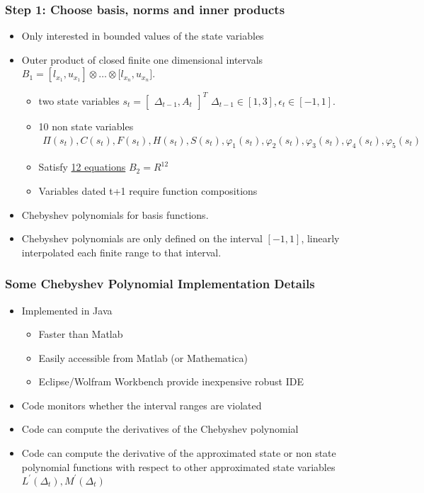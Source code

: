 \documentclass[handout]{beamer}
\begin{document}
\begin{frame}

\frametitle{Step 1: Choose basis, norms and inner products }

\begin{itemize}
\item Only interested in bounded values of the state variables
\item Outer product of closed finite one dimensional intervals
  $B_{1}=[l_{x_{1}},u_{x_{1}}]\otimes \ldots \otimes \lbrack
  l_{x_{n}},u_{x_{n}}]$.
  \begin{itemize}
  \item two state variables $s_t =
    \begin{bmatrix}
      \Delta_{t-1}, A_{t}
    \end{bmatrix}^T$ $\Delta _{t-1} \in [1,3], \epsilon_t \in [-1,1]$.
  \item 10 non state variables
    \begin{gather*}
      \Pi(s_{t}), C(s_{t}), F(s_{t}), H(s_{t}), S(s_{t}),
      \varphi_1(s_{t}),\varphi_{2}(s_{t}),\varphi_{3}(s_{t}),
      \varphi_{4}(s_{t}),\varphi_5(s_{t})
    \end{gather*}
  \item Satisfy \hyperref[eqns]{12 equations} $B_2=R^{12}$
  \item Variables dated t+1 require function compositions
  \end{itemize}
\item Chebyshev polynomials for basis functions.
\item Chebyshev polynomials are only defined on the interval $[-1,1]$,
  linearly interpolated each finite range to that interval.
\end{itemize}

\end{frame}
\begin{frame}

\frametitle{Some Chebyshev Polynomial Implementation Details}
\begin{itemize}
\item Implemented in Java
  \begin{itemize}
  \item Faster than Matlab
  \item Easily accessible from Matlab (or Mathematica)
  \item Eclipse/Wolfram Workbench provide inexpensive robust IDE
  \end{itemize}
\item Code monitors whether the interval ranges are violated
\item Code can compute the derivatives of the Chebyshev polynomial
\item Code can compute the derivative of the approximated state or non
  state polynomial functions with respect to other approximated state
  variables $L^\prime(\Delta_t), M^\prime(\Delta_t)$
\end{itemize}



\end{frame}
\end{document}
